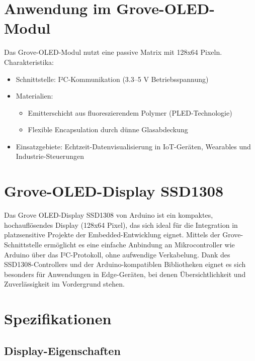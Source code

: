 \cite{Bartlett:2023} \cite{Stotz:2019} \cite{Wellmann:2017}

\section{Anwendung im Grove-OLED-Modul}
Das Grove-OLED-Modul nutzt eine passive Matrix mit 128x64 Pixeln. Charakteristika:
\begin{itemize}
	\item Schnittstelle: I²C-Kommunikation (3.3–5 V Betriebsspannung)
	\item Materialien:
	\begin{itemize}
		\item Emitterschicht aus fluoreszierendem Polymer (PLED-Technologie)
		\item Flexible Encapsulation durch dünne Glasabdeckung
	\end{itemize}
	\item Einsatzgebiete:
	Echtzeit-Datenvisualisierung in IoT-Geräten, Wearables und Industrie-Steuerungen
\end{itemize}
\cite{Seeedstudio:2025b}



\section{Grove-OLED-Display SSD1308}

Das Grove OLED-Display SSD1308 von Arduino ist ein kompaktes, hochauflösendes Display (128x64 Pixel), das sich ideal für die Integration in platzsensitive Projekte der Embedded-Entwicklung eignet. Mittels der Grove-Schnittstelle ermöglicht es eine einfache Anbindung an Mikrocontroller wie Arduino über das I²C-Protokoll, ohne aufwendige Verkabelung. Dank des SSD1308-Controllers und der Arduino-kompatiblen Bibliotheken eignet es sich besonders für Anwendungen in Edge-Geräten, bei denen Übersichtlichkeit und Zuverlässigkeit im Vordergrund stehen. \cite{Seeedstudio:2025b}

\section{Spezifikationen}

\subsection{Display-Eigenschaften} 

